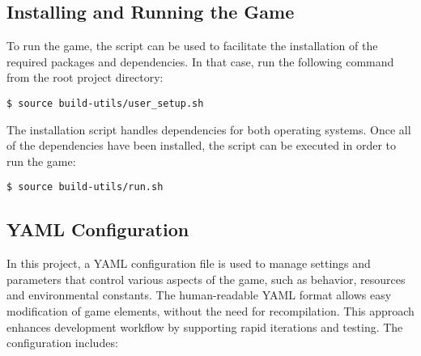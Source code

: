 \subsection{Installing and Running the Game}
To run the game, the script  can be used to facilitate the installation of the required packages and dependencies.
In that case, run the following command from the root project directory:

\begin{verbatim}
$ source build-utils/user_setup.sh
\end{verbatim}


The installation script handles dependencies for both operating systems.
Once all of the dependencies have been installed, the script  can be executed in order to run the game:
\begin{verbatim}
$ source build-utils/run.sh
\end{verbatim}

\subsection{YAML Configuration}

In this project, a YAML configuration file is used to manage settings and parameters that control various aspects of the game, such as behavior, resources and environmental constants.
The human-readable YAML format allows easy modification of game elements, without the need for recompilation.
This approach enhances development workflow by supporting rapid iterations and testing. The configuration includes:

